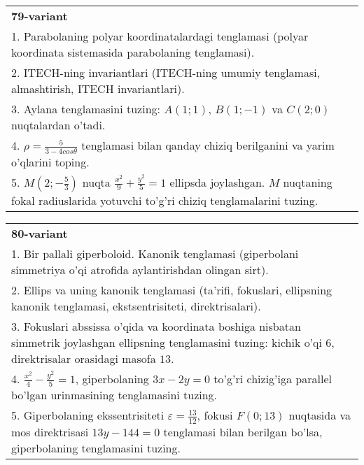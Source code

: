 \documentclass{article}
\begin{document}
\begin{tabular}{m{17cm}}
\textbf{79-variant}\\
1. Parabolaning polyar koordinatalardagi tenglamasi (polyar koordinata sistemasida parabolaning tenglamasi).\\

2. ITECH-ning invariantlari (ITECH-ning umumiy tenglamasi, almashtirish, ITECH invariantlari).\\

3. Aylana tenglamasini tuzing: $A(1;1)$, $B(1;-1)$ va $C(2;0)$ nuqtalardan o'tadi.\\

4. $\rho = \frac{5}{3 - 4cos\theta}$ tenglamasi bilan qanday chiziq berilganini va yarim o'qlarini toping.  \\

5. $M(2; - \frac{5}{3})$ nuqta $\frac{x^{2}}{9} + \frac{y^{2}}{5} = 1$ ellipsda joylashgan. $M$ nuqtaning fokal radiuslarida yotuvchi to'g'ri chiziq tenglamalarini tuzing.  
\end{tabular}
\vspace{1cm}


\begin{tabular}{m{17cm}}
\textbf{80-variant}\\
1. Bir pallali giperboloid. Kanonik tenglamasi (giperbolani simmetriya o'qi atrofida aylantirishdan olingan sirt).\\

2. Ellips va uning kanonik tenglamasi (ta'rifi, fokuslari, ellipsning kanonik tenglamasi, ekstsentrisiteti, direktrisalari).\\

3. Fokuslari abssissa o'qida va koordinata boshiga nisbatan simmetrik joylashgan ellipsning tenglamasini tuzing: kichik o'qi $6$, direktrisalar orasidagi masofa $13$.\\

4. $\frac{x^{2}}{4} - \frac{y^{2}}{5} = 1$, giperbolaning $3x - 2y = 0$ to'g'ri chizig'iga parallel bo'lgan urinmasining tenglamasini tuzing.  \\

5. Giperbolaning ekssentrisiteti $\varepsilon = \frac{13}{12}$, fokusi $F(0;13)$ nuqtasida va mos direktrisasi $13y - 144 = 0$ tenglamasi bilan berilgan bo'lsa, giperbolaning tenglamasini tuzing.  
\end{tabular}
\vspace{1cm}
\end{document}
